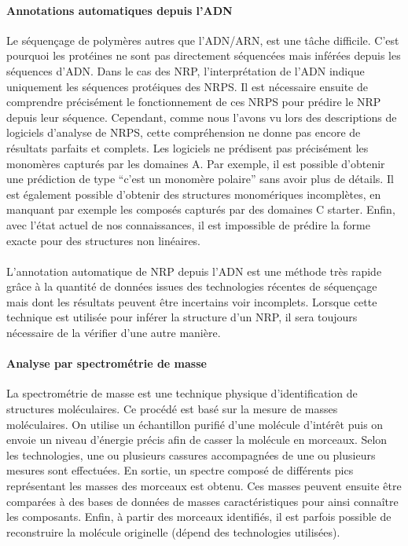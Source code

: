 \documentclass[12pt,french,twoside]{report}
\begin{document}
\paragraph{Annotations automatiques depuis l'ADN}
Le séquençage de polymères autres que l'ADN/ARN, est une tâche difficile.
C'est pourquoi les protéines ne sont pas directement séquencées mais inférées depuis les séquences d'ADN.
Dans le cas des NRP, l'interprétation de l'ADN indique uniquement les séquences protéiques des NRPS.
Il est nécessaire ensuite de comprendre précisément le fonctionnement de ces NRPS pour prédire le NRP depuis leur séquence.
Cependant, comme nous l'avons vu lors des descriptions de logiciels d'analyse de NRPS, cette compréhension ne donne pas encore de résultats parfaits et complets.
Les logiciels ne prédisent pas précisément les monomères capturés par les domaines A.
Par exemple, il est possible d'obtenir une prédiction de type ``c'est un monomère polaire'' sans avoir plus de détails.
Il est également possible d'obtenir des structures monomériques incomplètes, en manquant par exemple les composés capturés par des domaines C starter.
Enfin, avec l'état actuel de nos connaissances, il est impossible de prédire la forme exacte pour des structures non linéaires.

\paragraph{}L'annotation automatique de NRP depuis l'ADN est une méthode très rapide grâce à la quantité de données issues des technologies récentes de séquençage mais dont les résultats peuvent être incertains voir incomplets.
Lorsque cette technique est utilisée pour inférer la structure d'un NRP, il sera toujours nécessaire de la vérifier d'une autre manière.


\paragraph{Analyse par spectrométrie de masse}
La spectrométrie de masse est une technique physique d'identification de structures moléculaires.
Ce procédé est basé sur la mesure de masses moléculaires.
On utilise un échantillon purifié d'une molécule d'intérêt puis on envoie un niveau d'énergie précis afin de casser la molécule en morceaux.
Selon les technologies, une ou plusieurs cassures accompagnées de une ou plusieurs mesures sont effectuées.
En sortie, un spectre composé de différents pics représentant les masses des morceaux est obtenu.
Ces masses peuvent ensuite être comparées à des bases de données de masses caractéristiques pour ainsi connaître les composants.
Enfin, à partir des morceaux identifiés, il est parfois possible de reconstruire la molécule originelle (dépend des technologies utilisées).
\end{document}
